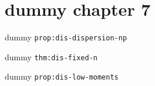 \clearpage\begingroup\small
\setcounter{chapter}{7}\addtocounter{chapter}{-1}
\chapter{dummy chapter 7}
\begin{proposition}\label{prop:dis-dispersion-np}dummy \texttt{prop:dis-dispersion-np}\end{proposition}
\begin{theorem}\label{thm:dis-fixed-n}dummy \texttt{thm:dis-fixed-n}\end{theorem}
\begin{proposition}\label{prop:dis-low-moments}dummy \texttt{prop:dis-low-moments}\end{proposition}
\endgroup
